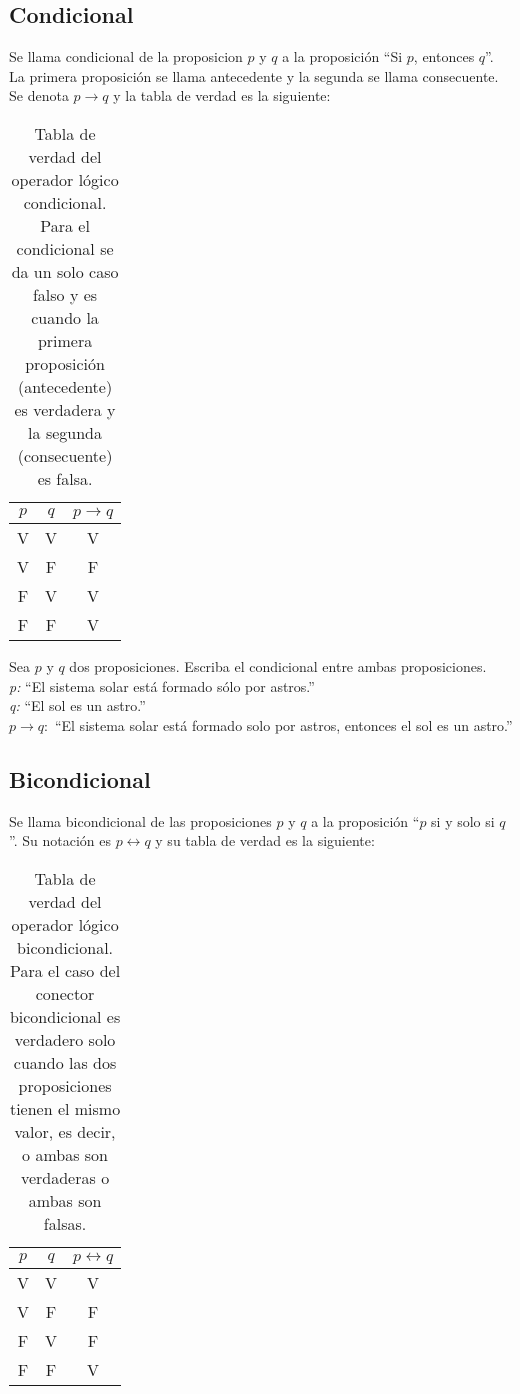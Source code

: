 \subsection{Condicional}
Se llama condicional de la proposicion $p$ y $q$ a la proposición ``Si $p$, entonces $q$''. La primera proposición se llama antecedente y la segunda se llama consecuente. Se denota $p\rightarrow q$ y la tabla de verdad es la siguiente:
\begin{table}[h!]
	\begin{center}
		\begin{tabular}{|c|c|c|}
\hline
$p$&$q$&$p\rightarrow q$\\
\hline
V&V&V\\
\hline
V&F&F\\
\hline
F&V&V\\
\hline
F&F&V\\
\hline
		\end{tabular}
	\end{center}
\caption[Tabla de verdad del operador lógico condicional.]{Tabla de verdad del operador lógico condicional. Para el condicional se da un solo caso falso y es cuando la primera proposición (antecedente) es verdadera y la segunda (consecuente) es falsa.}
\end{table}

\begin{myexample}
Sea $p$ y $q$ dos proposiciones. Escriba el condicional entre ambas proposiciones.\\

\noindent\textit{p:} ``El sistema solar está formado sólo por astros.''\\
\textit{q:} ``El sol es un astro.''\\
\textit{$p\rightarrow q:$} ``El sistema solar está formado solo por astros, entonces el sol es un astro.''\\
\end{myexample}


\subsection{Bicondicional}
 Se llama bicondicional de las proposiciones $p$ y $q$ a la proposición ``$p$ si y solo si $q$''. Su notación es $p \longleftrightarrow q$ y su tabla de verdad es la siguiente:\\
\begin{table}[h!]
 	\begin{center}
		\begin{tabular}{|c|c|c|}
\hline
$p$&$q$&$p \longleftrightarrow q$\\
\hline
V&V&V\\
\hline
V&F&F\\
\hline
F&V&F\\
\hline
F&F&V\\
\hline
		\end{tabular}
	\end{center}
\caption[Tabla de verdad del operador lógico bicondicional.]{Tabla de verdad del operador lógico bicondicional. Para el caso del conector bicondicional es verdadero solo cuando las dos proposiciones tienen el mismo valor, es decir, o ambas son verdaderas o ambas son falsas.}
\end{table}
 
